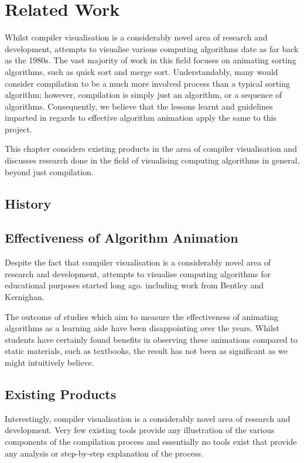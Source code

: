 \documentclass{l4proj}
\begin{document}
\chapter{Related Work}
Whilst compiler visualisation is a considerably novel area of research and development, attempts to visualise various computing algorithms date as far back as the 1980s. The vast majority of work in this field focuses on animating sorting algorithms, such as quick sort and merge sort. Understandably, many would consider compilation to be a much more involved process than a typical sorting algorithm; however, compilation is simply just an algorithm, or a sequence of algorithms. Consequently, we believe that the lessons learnt and guidelines imparted in regards to effective algorithm animation apply the same to this project.

This chapter considers existing products in the area of compiler visualisation and discusses research done in the field of visualising computing algorithms in general, beyond just compilation.

\section{History}

\section{Effectiveness of Algorithm Animation}
Despite the fact that compiler visualisation is a considerably novel area of research and development, attempts to visualise computing algorithms for educational purposes started long ago.  including work from Bentley and Kernighan. 

The outcome of studies which aim to measure the effectiveness of animating algorithms as a learning aide have been disappointing over the years. Whilst students have certainly found benefits in observing these animations compared to static materials, such as textbooks, the result has not been as significant as we might intuitively believe. 

\section{Existing Products}
Interestingly, compiler visualisation is a considerably novel area of research and development. Very few existing tools provide any illustration of the various components of the compilation process and essentially no tools exist that provide any analysis or step-by-step explanation of the process.
\end{document}
